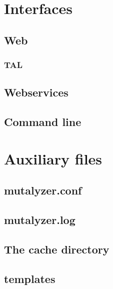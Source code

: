 \documentclass{article}
\begin{document}
\newpage

\section{Interfaces} \label{sec:interfaces}

\subsection{Web} \label{subsec:webinterface}

\subsubsection{TAL} \label{subsubsec:templates}

\subsection{Webservices} \label{subsec:webservinterface}

\subsection{Command line} \label{subsec:commandline}

\newpage

\section{Auxiliary files}

\subsection{mutalyzer.conf}

\subsection{mutalyzer.log}

\subsection{The cache directory}

\subsection{templates}

\newpage

\appendix
\end{document}
